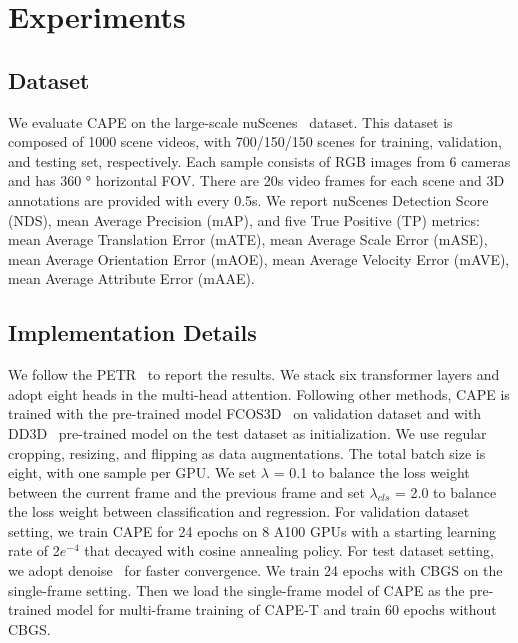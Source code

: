 \documentclass[10pt,twocolumn,letterpaper]{article}
\newcommand{\ourMethod}{CAPE}
\begin{document}
 \section{Experiments}
\subsection{Dataset}
We evaluate \ourMethod{} on the large-scale  nuScenes~\cite{caesar2020nuscenes} dataset. This dataset is composed of 1000 scene videos, with 700/150/150 scenes for training, validation, and testing set, respectively. Each sample consists of RGB images from 6 cameras and has 360 ° horizontal FOV. There are 20s video frames for each scene and 3D annotations are provided with every 0.5s. We report nuScenes Detection Score (NDS), mean Average Precision (mAP), and five True Positive (TP) metrics: mean Average Translation Error (mATE), mean Average Scale Error (mASE), mean Average Orientation Error (mAOE), mean Average Velocity Error (mAVE), mean Average Attribute Error (mAAE).

\subsection{Implementation Details}
We follow the PETR~\cite{liu2022petr} to report the results. We stack six transformer layers and adopt eight heads in the multi-head attention. 
Following other methods\cite{liu2022petr,wang2022detr3d, huang2021bevdet}, \ourMethod{} is trained with the pre-trained model FCOS3D~\cite{wang2021fcos3d} on validation dataset and with DD3D~\cite{park2021pseudo} pre-trained model on the test dataset as initialization. We use regular cropping, resizing, and flipping as data augmentations. The total batch size is eight, with one sample per GPU. 
We set $\lambda$ = 0.1 to balance the loss weight between the current frame and the previous frame and set $\lambda_{cls}$ = 2.0 to balance the loss weight between classification and regression. 
For validation dataset setting, we train \ourMethod{} for 24 epochs on 8 A100 GPUs with a starting learning rate of 2$e^{-4}$ that decayed with cosine annealing policy. 
For test dataset setting, we adopt denoise~\cite{zhang2022dino} for faster convergence. We train 24 epochs with CBGS on the single-frame setting. Then we load the single-frame model of CAPE as the pre-trained model for multi-frame training of CAPE-T and train 60 epochs without CBGS. 
\end{document}
